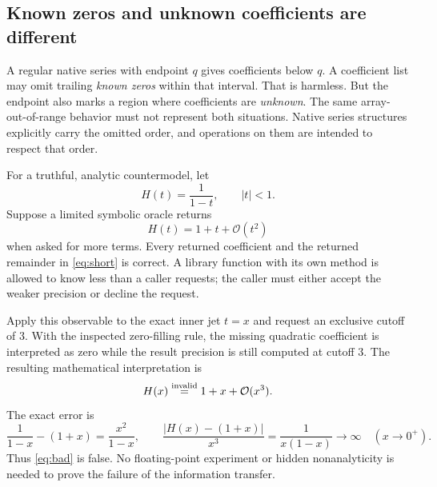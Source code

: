 \documentclass[11pt,letterpaper]{article}
\newcommand{\OO}{\mathcal{O}}
\theoremstyle{definition}\newtheorem{definition}[proposition]{Definition}
\begin{document}
\subsection{Known zeros and unknown coefficients are different}
A regular native series with endpoint $q$ gives coefficients below $q$.
A coefficient list may omit trailing \emph{known zeros} within that interval.
That is harmless. But the endpoint also marks a region where coefficients are
\emph{unknown}. The same array-out-of-range behavior must not represent both
situations. Native series structures explicitly carry the omitted order, and
operations on them are intended to respect that order.\cite{wlsd}

For a truthful, analytic countermodel, let
\begin{equation}
 H(t)=\frac{1}{1-t},\qquad |t|<1.
\end{equation}
Suppose a limited symbolic oracle returns
\begin{equation}\label{eq:short}
 H(t)=1+t+\OO(t^2)
\end{equation}
when asked for more terms. Every returned coefficient and the returned
remainder in \eqref{eq:short} is correct. A library function with its own
 method is allowed to know less than a caller requests; the
caller must either accept the weaker precision or decline the request.

Apply this observable to the exact inner jet $t=x$ and request an exclusive
cutoff of $3$. With the inspected zero-filling rule, the missing quadratic
coefficient is interpreted as zero while the result precision is still
computed at cutoff $3$. The resulting mathematical interpretation is
\begin{equation}\label{eq:bad}
 H(x)\stackrel{\rm invalid}{=}1+x+\OO(x^3).
\end{equation}
The exact error is
\begin{equation}\label{eq:exacterror}
 \frac{1}{1-x}-(1+x)=\frac{x^2}{1-x},\qquad
 \frac{\left|H(x)-(1+x)\right|}{x^3}=\frac{1}{x(1-x)}\longrightarrow\infty
 \quad(x\to0^+).
\end{equation}
Thus \eqref{eq:bad} is false. No floating-point experiment or hidden
nonanalyticity is needed to prove the failure of the information transfer.
\end{document}
